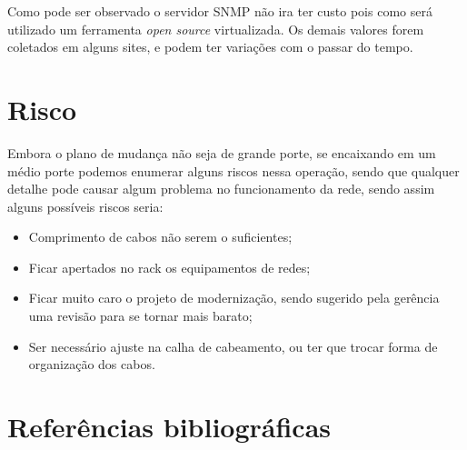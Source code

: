\documentclass[	DIV=calc,%
							paper=a4,%
							fontsize=12pt,%
							onecolumn]{scrartcl}	 					%
\begin{document}
Como pode ser observado o servidor SNMP não ira ter custo pois como será utilizado um ferramenta \textit{open source} virtualizada. Os demais valores forem coletados em alguns sites, e podem ter variações com o passar do tempo. 

\section{Risco}
Embora o plano de mudança não seja de grande porte, se encaixando em um médio porte podemos enumerar alguns riscos nessa operação, sendo que qualquer detalhe pode causar algum problema no funcionamento da rede, sendo assim alguns possíveis riscos seria:

\begin{itemize}
	\item Comprimento de cabos não serem o suficientes;
	\item Ficar apertados no rack os equipamentos de redes;
	\item Ficar muito caro o projeto de modernização, sendo sugerido pela gerência uma revisão para se tornar mais barato;
	\item Ser necessário ajuste na calha de cabeamento, ou ter que trocar forma de organização dos cabos.
\end{itemize}


\section{Referências bibliográficas}
\renewcommand\refname{} %

  
\end{document}
